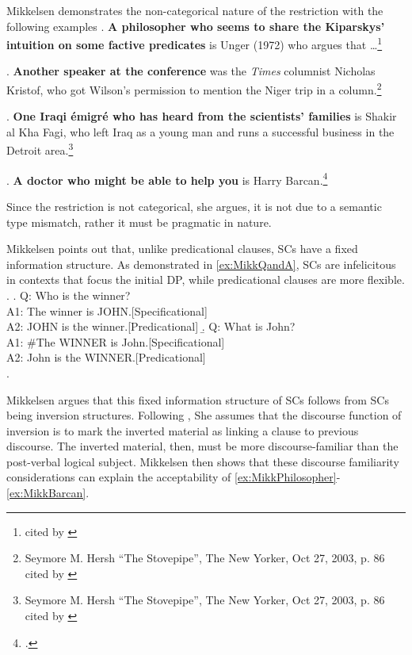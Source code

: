 \documentclass[GPFinal]{subfiles}
\begin{document}
Mikkelsen demonstrates the non-categorical nature of the restriction with the following examples
\ex.\label{ex:MikkPhilosopher} \textbf{A philosopher who seems to share the Kiparskys' intuition on some factive predicates} is Unger (1972) who argues that \dots\footnote{\textcite[][p. 195 fn8]{delacruz1976factives} cited by \textcite{mikkelsen2004specifying}}

\ex.\label{ex:MikkSpeaker} \textbf{Another speaker at the conference} was the \textit{Times} columnist Nicholas Kristof, who got Wilson's permission to mention the Niger trip in a column.\footnote{Seymore M. Hersh ``The Stovepipe'', The New Yorker, Oct 27, 2003, p. 86 cited by \textcite{mikkelsen2004specifying}}

\ex.\label{ex:MikkEmigre} \textbf{One Iraqi \'emigr\'e who has heard from the scientists' families} is Shakir al Kha Fagi, who left Iraq as a young man and runs a successful business in the Detroit area.\footnote{Seymore M. Hersh ``The Stovepipe'', The New Yorker, Oct 27, 2003, p. 86 cited by \textcite{mikkelsen2004specifying}}

\ex.\label{ex:MikkBarcan} \textbf{A doctor who might be able to help you} is Harry Barcan.\footcite{mikkelsen2004specifying}

Since the restriction is not categorical, she argues, it is not due to a semantic type mismatch, rather it must be pragmatic in nature.

Mikkelsen points out that, unlike predicational clauses, SCs have a fixed information structure.
As demonstrated in \ref{ex:MikkQandA}, SCs are infelicitous in contexts that focus the initial DP, while predicational clauses are more flexible.
\ex.\label{ex:MikkQandA}
\a. Q: Who is the winner?\\
A1: The winner is JOHN.\hfill[Specificational]\\
A2: JOHN is the winner.\hfill[Predicational]
\b. Q: What is John?\\
A1: \#The WINNER is John.\hfill[Specificational]\\
A2: John is the WINNER.\hfill[Predicational]\\
\z.

Mikkelsen argues that this fixed information structure of SCs follows from SCs being inversion structures.
Following \textcite{birner1994information,birner1996discourse}, She assumes that the discourse function of inversion is to mark the inverted material as linking a clause to previous discourse.
The inverted material, then, must be more discourse-familiar than the post-verbal logical subject.
Mikkelsen then shows that these discourse familiarity considerations can explain the acceptability of \ref{ex:MikkPhilosopher}-\ref{ex:MikkBarcan}.
\end{document}

